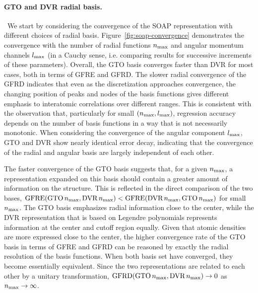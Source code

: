 \paragraph*{GTO and DVR radial basis.}\,
\label{sec:gto-dvr-comparison}
We start by considering the convergence of the SOAP representation with different choices of radial basis. Figure~\ref{fig:soap-convergence} demonstrates the convergence  with the number of radial functions $n_\mathrm{max}$ and angular momentum channels $l_\mathrm{max}$ (in a Cauchy sense, i.e. comparing results for successive increments of these parameters). Overall, the GTO basis converges faster than DVR for most cases, both in terms of GFRE and GFRD. 
The slower radial convergence of the GFRD indicates that even as the discretization approaches convergence, the changing position of peaks and nodes of the basis functions gives different emphasis to interatomic correlations over different ranges. This is consistent with the observation that, particularly for small $(n_\mathrm{max}, l_\mathrm{max})$, regression accuracy depends on the number of basis functions in a way that is not necessarily monotonic.
When considering the convergence of the angular component $l_\mathrm{max}$, GTO and DVR show nearly identical error decay, indicating that the convergence of the radial and angular basis are largely independent of each other.
 
The faster convergence of the GTO basis suggests that, for a given $n_\mathrm{max}$, a representation expanded on this basis should contain a greater amount of information on the structure. This is reflected in the direct comparison of the two bases, $\operatorname{GFRE}(\text{GTO}\,n_\mathrm{max},\text{DVR}\,n_\mathrm{max})<\operatorname{GFRE}(\text{DVR}\,n_\mathrm{max},\text{GTO}\,n_\mathrm{max})$ for small $n_\mathrm{max}$.
The GTO basis emphasizes radial information close to the center, while the DVR representation that is based on Legendre polynomials represents information at the center and cutoff region equally.
Given that atomic densities are more expressed close to the center, the higher convergence rate of the GTO basis in terms of GFRE and GFRD can be reasoned by exactly the radial resolution of the basis functions.
When both basis set have converged, they become essentially equivalent. Since the two representations are related to each other by a unitary transformation,  $\operatorname{GFRD}(\text{GTO}\,n_\mathrm{max},\text{DVR}\,n_\mathrm{max})\rightarrow 0$ as $n_\mathrm{max}\rightarrow\infty$.

